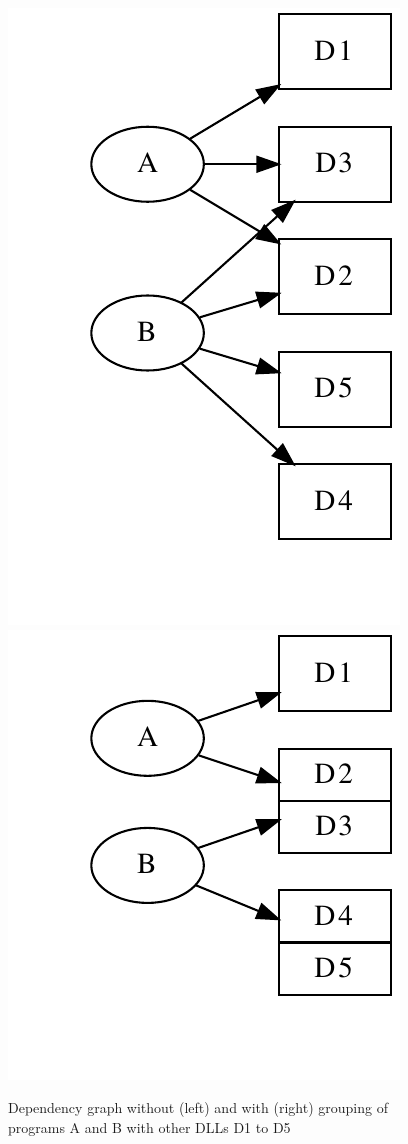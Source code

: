 \begin{figure}
\centering
\includegraphics[scale=0.4]{depvis/example-split.pdf}
\hspace{15mm}
\includegraphics[scale=0.4]{depvis/example-group.pdf}
\caption{Dependency graph without (left) and with (right) grouping of programs
A and B with other DLLs D1 to D5}
\label{fig:grouping}
\end{figure}

